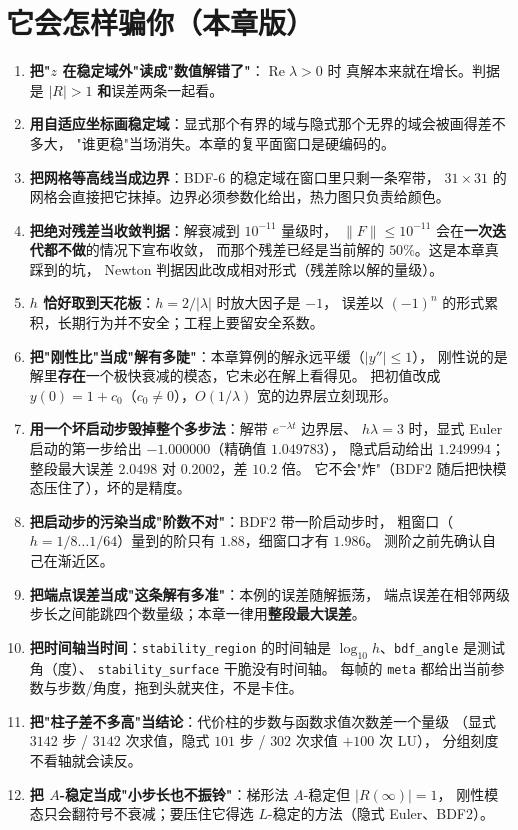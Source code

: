 

\section{它会怎样骗你（本章版）}

\begin{enumerate}
  \item \textbf{把"$z$ 在稳定域外"读成"数值解错了"}：$\operatorname{Re}\lambda>0$ 时
        真解本来就在增长。判据是 $|R|>1$ \textbf{和}误差两条一起看。
  \item \textbf{用自适应坐标画稳定域}：显式那个有界的域与隐式那个无界的域会被画得差不多大，
        "谁更稳"当场消失。本章的复平面窗口是硬编码的。
  \item \textbf{把网格等高线当成边界}：BDF-6 的稳定域在窗口里只剩一条窄带，
        $31\times31$ 的网格会直接把它抹掉。边界必须参数化给出，热力图只负责给颜色。
  \item \textbf{把绝对残差当收敛判据}：解衰减到 $10^{-11}$ 量级时，
        $\|F\|\le10^{-11}$ 会在\textbf{一次迭代都不做}的情况下宣布收敛，
        而那个残差已经是当前解的 $50\%$。这是本章真踩到的坑，
        Newton 判据因此改成相对形式（残差除以解的量级）。
  \item \textbf{$h$ 恰好取到天花板}：$h=2/|\lambda|$ 时放大因子是 $-1$，
        误差以 $(-1)^n$ 的形式累积，长期行为并不安全；工程上要留安全系数。
  \item \textbf{把"刚性比"当成"解有多陡"}：本章算例的解永远平缓（$|y''|\le1$），
        刚性说的是解里\textbf{存在}一个极快衰减的模态，它未必在解上看得见。
        把初值改成 $y(0)=1+c_0$（$c_0\ne0$），$O(1/\lambda)$ 宽的边界层立刻现形。
  \item \textbf{用一个坏启动步毁掉整个多步法}：解带 $e^{-\lambda t}$ 边界层、
        $h\lambda=3$ 时，显式 Euler 启动的第一步给出 $-1.000000$（精确值 $1.049783$），
        隐式启动给出 $1.249994$；整段最大误差 $2.0498$ 对 $0.2002$，差 $10.2$ 倍。
        它不会"炸"（BDF2 随后把快模态压住了），坏的是精度。
  \item \textbf{把启动步的污染当成"阶数不对"}：BDF2 带一阶启动步时，
        粗窗口（$h=1/8\ldots1/64$）量到的阶只有 $1.88$，细窗口才有 $1.986$。
        测阶之前先确认自己在渐近区。
  \item \textbf{把端点误差当成"这条解有多准"}：本例的误差随解振荡，
        端点误差在相邻两级步长之间能跳四个数量级；本章一律用\textbf{整段最大误差}。
  \item \textbf{把时间轴当时间}：\texttt{stability\_\allowbreak{}region} 的时间轴是
        $\log_{10}h$、\texttt{bdf\_\allowbreak{}angle} 是测试角（度）、
        \texttt{stability\_\allowbreak{}surface} 干脆没有时间轴。
        每帧的 \texttt{meta} 都给出当前参数与步数/角度，拖到头就夹住，不是卡住。
  \item \textbf{把"柱子差不多高"当结论}：代价柱的步数与函数求值次数差一个量级
        （显式 $3142$ 步 / $3142$ 次求值，隐式 $101$ 步 / $302$ 次求值 $+100$ 次 LU），
        分组刻度不看轴就会读反。
  \item \textbf{把 $A$-稳定当成"小步长也不振铃"}：梯形法 $A$-稳定但 $|R(\infty)|=1$，
        刚性模态只会翻符号不衰减；要压住它得选 $L$-稳定的方法（隐式 Euler、BDF2）。
\end{enumerate}
